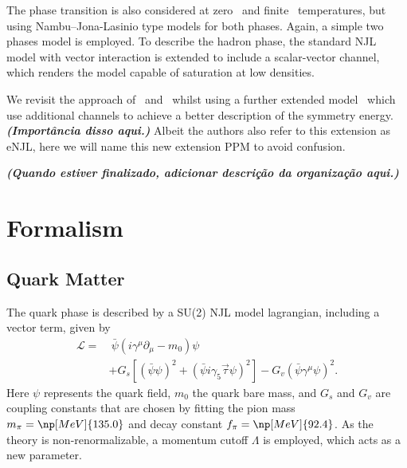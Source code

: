 \documentclass[prc, reprint, amsmath, floatfix, linenumbers,10pt]{revtex4-1}
\newcommand{\comment}[1]{{\bf\textit{#1}}}
\begin{document}
The phase transition is also considered at zero~\cite{Tsue2010} and finite~\cite{Lee2013} temperatures, but using Nambu--Jona-Lasinio type models for both phases. Again, a simple two phases model is employed. To describe the hadron phase, the standard NJL model with vector interaction is extended to include a scalar-vector channel, which renders the model capable of saturation at low densities.

We revisit the approach of~\cite{Tsue2010} and~\cite{Lee2013} whilst using a further extended model~\cite{Pais2016} which use additional channels to achieve a better description of the symmetry energy. \comment{(Importância disso aqui.)} Albeit the authors also refer to this extension as eNJL, here we will name this new extension PPM to avoid confusion.

\comment{(Quando estiver finalizado, adicionar descrição da organização aqui.)}

\section{Formalism}

\subsection{Quark Matter}

The quark phase is described by a SU(2) NJL model lagrangian, including a vector term, given by\cite{Buballa2005}
\begin{equation}\label{Eq:LagNJL-SU2-Bub}
\begin{split}
	\mathcal{L} =&~ \bar{\psi}(i\gamma^\mu\partial_\mu - m_0)\psi \\
	&+ G_s[(\bar{\psi}\psi)^2 + (\bar{\psi}i\gamma_5\vec{\tau}\psi)^2] - G_v(\bar{\psi}\gamma^\mu \psi)^2.
\end{split}
\end{equation}
%
Here $\psi$ represents the quark field, $m_0$ the quark bare mass, and $G_s$ and $G_v$ are coupling constants that are chosen by fitting the pion mass $m_\pi = \np[MeV]{135.0}$ and decay constant $f_\pi = \np[MeV]{92.4}$. As the theory is non-renormalizable, a momentum cutoff $\Lambda$ is employed, which acts as a new parameter.
\end{document}
